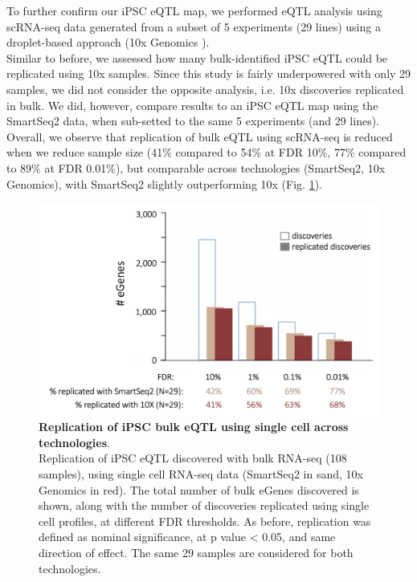 To further confirm our iPSC eQTL map, we performed eQTL analysis using scRNA-seq data generated from a subset of 5 experiments (29 lines) using a droplet-based approach (10x Genomics \cite{zheng2017massively}).\\

Similar to before, we assessed how many bulk-identified iPSC eQTL could be replicated using 10x samples.
Since this study is fairly underpowered with only 29 samples, we did not consider the opposite analysis, i.e. 10x discoveries replicated in bulk.
We did, however, compare results to an iPSC eQTL map using the SmartSeq2 data, when sub-setted to the same 5 experiments (and 29 lines). \\

Overall, we observe that replication of bulk eQTL using scRNA-seq is reduced when we reduce sample size (41\% compared to 54\% at FDR 10\%, 77\% compared to 89\% at FDR 0.01\%), but comparable across technologies (SmartSeq2, 10x Genomics), with SmartSeq2 slightly outperforming 10x (Fig. \ref{fig:sc_bulk_10x_egenes}).\\

\begin{figure}[h]
\includegraphics[width=13cm]{Chapter3/Fig/sc_vs_bulk_vs_10x.png}
\caption[iPSC bulk eQTL replication]{\textbf{Replication of iPSC bulk eQTL using single cell across technologies}.\\
Replication of iPSC eQTL discovered with bulk RNA-seq (108 samples), using single cell RNA-seq data (SmartSeq2 in sand, 10x Genomics in red). 
The total number of bulk eGenes discovered is shown, along with the number of discoveries replicated using single cell profiles, at different FDR thresholds. 
As before, replication was defined as nominal significance, at p value < 0.05, and same direction of effect. 
The same 29 samples are considered for both technologies.}
\label{fig:sc_bulk_10x_egenes}
\end{figure}

